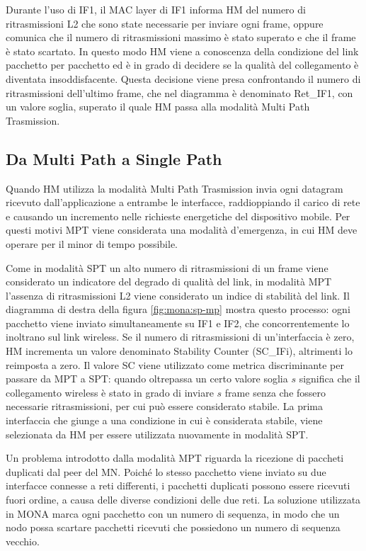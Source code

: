 \documentclass[12pt,a4paper,openright,twoside]{book}
\begin{document}
Durante l'uso di IF1, il MAC layer di IF1 informa HM del numero di
ritrasmissioni L2 che sono state necessarie per inviare ogni frame,
oppure comunica che il numero di ritrasmissioni massimo è stato
superato e che il frame è stato scartato. In questo modo HM viene a
conoscenza della condizione del link pacchetto per pacchetto ed è in
grado di decidere se la qualità del collegamento è diventata
insoddisfacente. Questa decisione viene presa confrontando il numero
di ritrasmissioni dell'ultimo frame, che nel diagramma è denominato
Ret\_IF1, con un valore soglia, superato il quale HM passa alla
modalità Multi Path Trasmission.

\subsection{Da Multi Path a Single Path}

Quando HM utilizza la modalità Multi Path Trasmission invia ogni
datagram ricevuto dall'applicazione a entrambe le interfacce,
raddioppiando il carico di rete e causando un incremento nelle
richieste energetiche del dispositivo mobile. Per questi motivi MPT
viene considerata una modalità d'emergenza, in cui HM deve operare per
il minor di tempo possibile.

Come in modalità SPT un alto numero di ritrasmissioni di un frame
viene considerato un indicatore del degrado di qualità del link, in
modalità MPT l'assenza di ritrasmissioni L2 viene considerato un
indice di stabilità del link. Il diagramma di destra della figura
\ref{fig:mona:sp-mp} mostra questo processo: ogni pacchetto viene
inviato simultaneamente su IF1 e IF2, che concorrentemente lo
inoltrano sul link wireless. Se il numero di ritrasmissioni di
un'interfaccia è zero, HM incrementa un valore denominato Stability
Counter (SC\_IFi), altrimenti lo reimposta a zero. Il valore SC viene
utilizzato come metrica discriminante per passare da MPT a SPT: quando
oltrepassa un certo valore soglia $s$ significa che il collegamento
wireless è stato in grado di inviare $s$ frame senza che fossero
necessarie ritrasmissioni, per cui può essere considerato stabile. La
prima interfaccia che giunge a una condizione in cui è considerata
stabile, viene selezionata da HM per essere utilizzata nuovamente in
modalità SPT.

Un problema introdotto dalla modalità MPT riguarda la ricezione di
paccheti duplicati dal peer del MN. Poiché lo stesso pacchetto viene
inviato su due interfacce connesse a reti differenti, i pacchetti
duplicati possono essere ricevuti fuori ordine, a causa delle diverse
condizioni delle due reti. La soluzione utilizzata in MONA marca ogni
pacchetto con un numero di sequenza, in modo che un nodo possa
scartare pacchetti ricevuti che possiedono un numero di sequenza
vecchio.
\end{document}
